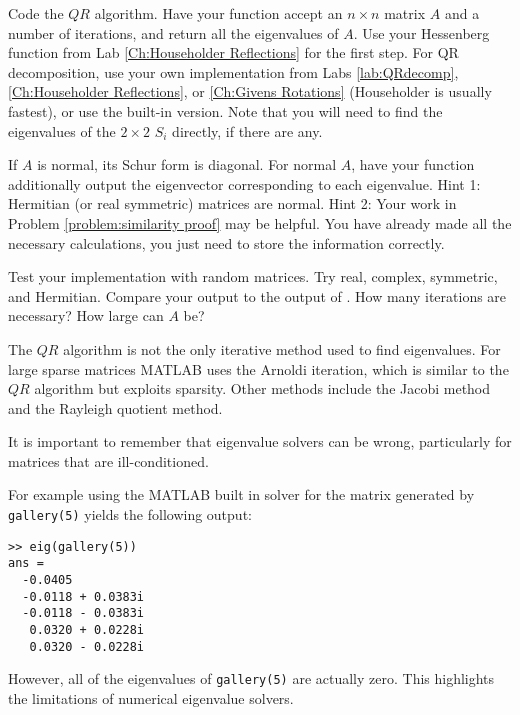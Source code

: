 \begin{problem}
Code the $QR$ algorithm. Have your function accept an $n \times n$ matrix $A$ and a number of iterations, and return all the eigenvalues of $A$. Use your Hessenberg function from Lab \ref{Ch:Householder Reflections} for the first step. For QR decomposition, use your own implementation from Labs \ref{lab:QRdecomp}, \ref{Ch:Householder Reflections}, or \ref{Ch:Givens Rotations} (Householder is usually fastest), or use the built-in version. Note that you will need to find the eigenvalues of the $2 \times 2$ $S_i$ directly, if there are any.
\end{problem}

\begin{problem}
If $A$ is normal, its Schur form is diagonal. For normal $A$, have your function additionally output the eigenvector corresponding to each eigenvalue. Hint 1: Hermitian (or real symmetric) matrices are normal. Hint 2: Your work in Problem \ref{problem:similarity proof} may be helpful. You have already made all the necessary calculations, you just need to store the information correctly.
\end{problem}

\begin{problem}
Test your implementation with random matrices. Try real, complex, symmetric, and Hermitian. Compare your output to the output of . How many iterations are necessary? How large can $A$ be?
\end{problem}

The $QR$ algorithm is not the only iterative method used to find eigenvalues. For large sparse matrices MATLAB uses the Arnoldi iteration, which is similar to the $QR$ algorithm but exploits sparsity. Other methods include the Jacobi method and the Rayleigh quotient method.

It is important to remember that eigenvalue solvers can be wrong, particularly for matrices that are ill-conditioned. 
\begin{matlab}
For example using the MATLAB built in solver for the matrix generated by {\tt gallery(5)} yields the following output:
\begin{lstlisting}[style=matlab]
>> eig(gallery(5))
ans =
  -0.0405          
  -0.0118 + 0.0383i
  -0.0118 - 0.0383i
   0.0320 + 0.0228i
   0.0320 - 0.0228i
\end{lstlisting}

However, all of the eigenvalues of {\tt gallery(5)} are actually zero. This highlights the limitations of numerical eigenvalue solvers.
\end{matlab}
